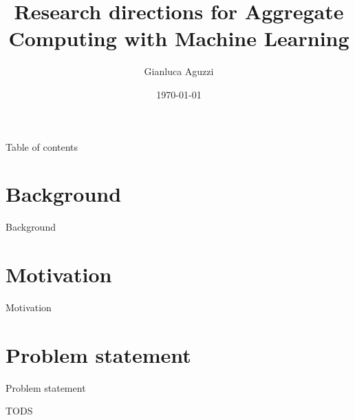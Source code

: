 \documentclass[aspectratio=169]{beamer}
\title{Research directions for Aggregate Computing with
Machine Learning}
\date{\today}
\author[G. Aguzzi]{Gianluca Aguzzi}
\begin{document}
\begin{frame}
\titlepage
\end{frame}

\begin{frame}{Table of contents}
\begin{card}
\tableofcontents
\end{card}
\end{frame}

\section{Background}
\begin{frame}{Background}

\end{frame}

\section{Motivation}
\begin{frame}{Motivation}

\end{frame}

\section{Problem statement}
\begin{frame}{Problem statement}
\begin{card}
TODS
\end{card}
\end{frame}
\end{document}
